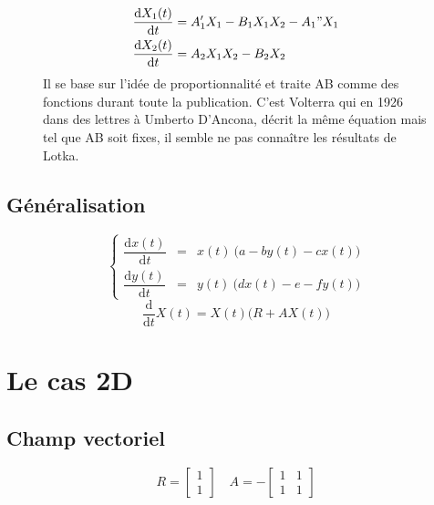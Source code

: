 \documentclass{wsdcr}
\begin{document}
\begin{figure}[b!]
{\begin{minipage}{.95\linewidth}
\begin{equation}
\begin{aligned}
{\dfrac {\mathrm {d} X_1(t)}{\mathrm {d} t}}&=A_1'X_1-B_1X_1X_2-A_1"X_1\\
{\dfrac {\mathrm {d} X_2(t)}{\mathrm {d} t}}&=A_2X_1X_2-B_2X_2
\end{aligned}
\end{equation}
Il se base sur l'idée de proportionnalité et traite AB comme des fonctions durant toute la publication. C'est Volterra qui en 1926 dans des lettres à Umberto D'Ancona, décrit la même équation mais tel que AB soit fixes, il semble ne pas connaître les résultats de Lotka.
\end{minipage}
}
\end{figure}
\subsection{Généralisation}
\begin{equation}
\left\{
{\begin{array}{ccc}{\dfrac {\mathrm {d} x(t)}{\mathrm {d} t}}&=&x(t)\ {\Big (}a -b y(t)-c x(t){\Big )}\\{\dfrac {\mathrm {d} y(t)}{\mathrm {d} t}}&=&y(t)\ {\Big (}d x(t)-e -f y(t) {\Big )}\end{array}}
\right.
\end{equation}
\begin{equation}
\dfrac {\mathrm {d}}{\mathrm {d} t}X(t)=X(t) {\Big (}R+AX(t){\Big )}
\end{equation}
\section{Le cas 2D}
\subsection{Champ vectoriel}
\begin{equation}
R={\begin{bmatrix}1\\1\end{bmatrix}}\quad A =-{\begin{bmatrix}1&1\\1&1\end{bmatrix}}
\label{eq:RSnInv}
\end{equation}
\end{document}
